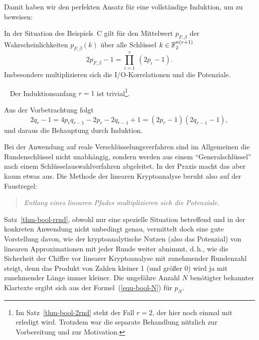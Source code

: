 \begin{refsegment}
Damit haben wir den perfekten Ansatz für eine vollständige Induktion,
um zu beweisen:

\begin{satz}\label{thm-bool-rrnd}
   In der Situation des Beispiels~C gilt für den Mittelwert $p_{F,\beta}$
   der Wahrscheinlichkeiten $p_{F,\beta}(k)$ über alle Schlüssel
   $k\in \mathbb{F}_2^{n(r+1)}$
\[
     2 p_{F,\beta} - 1 = \prod_{i=1}^r\: (2 p_i -1).
\]
   Insbesondere multiplizieren sich die I/O-Korrelationen
   und die Potenziale.
\end{satz}
\begin{Beweis} ~
   Der Induktionsanfang $r = 1$ ist trivial\footnote{%
     Im Satz~\ref{thm-bool-2rnd} steht der Fall $r = 2$, der hier noch
     einmal mit erledigt wird. Trotzdem war die separate Behandlung nützlich
     zur Vorbereitung und zur Motivation.
   }.

   Aus der Vorbetrachtung folgt
\[
     2 q_r - 1 = 4 p_r q_{r-1} - 2p_r - 2q_{r-1} + 1 = (2p_r-1)(2q_{r-1}-1),
\]
   und daraus die Behauptung durch Induktion.
\end{Beweis}

Bei der Anwendung auf reale Verschlüsselungsverfahren sind
im Allgemeinen die Rundenschlüssel nicht
unabhängig, sondern werden
aus einem "`Generalschlüssel"' nach einem Schlüsselauswahlverfahren
abgeleitet. In der Praxis macht das aber kaum etwas aus.
Die Methode der linearen
Kryptoanalyse
beruht also auf der Faustregel:
\begin{quote}
  {\em Entlang eines linearen Pfades
  multiplizieren sich die Potenziale.}
\end{quote}

Satz~\ref{thm-bool-rrnd}, obwohl nur eine spezielle Situation
betreffend und in der konkreten Anwendung nicht unbedingt genau,
vermittelt doch eine gute Vorstellung davon, wie der kryptoanalytische Nutzen
(also das Potenzial) von linearen Approximationen mit jeder Runde weiter abnimmt,
d.\,h., wie die Sicherheit der Chiffre vor linearer
Kryptoanalyse mit
zunehmender Rundenzahl steigt, denn das Produkt von Zahlen kleiner 1
(und größer 0) wird ja mit zunehmender Länge immer kleiner.
Die ungefähre Anzahl $N$ benötigter bekannter
Klartexte ergibt sich aus der Formel~(\ref{equ-bool-N}) für $p_N$.


\end{refsegment}
